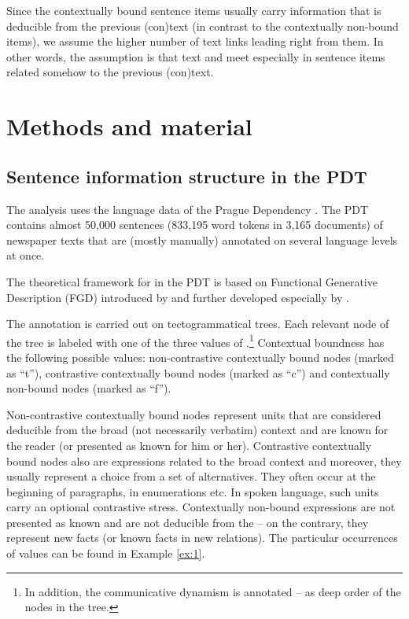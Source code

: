 \documentclass[output=paper]{langsci/langscibook.cls}
\begin{document}
Since the contextually bound sentence items usually carry information that is deducible from the previous (con)text (in contrast to the contextually non-bound items), we assume the higher number of text  links leading right from them. In other words, the assumption is that text  and  meet especially in sentence items related somehow to the previous (con)text.

\section{Methods and material\label{rysova_k:sec:MethodsAndMaterial}}

\subsection{Sentence information structure in the PDT\label{rysova_k:sec:SentenceInformation}}

The analysis uses the language data of the Prague Dependency . The PDT contains almost 50,000 sentences (833,195 word tokens in 3,165 documents) of  newspaper texts that are (mostly manually) annotated on several language levels at once. 

The theoretical framework for  in the PDT is based on Functional Generative Description (FGD) introduced by \citet{Sgall1967} and further developed especially by \citet{hajicova1998topic}. 

The annotation is carried out on tectogrammatical trees. Each relevant node of the tree is labeled with one of the three values of .\footnote{In addition, the communicative dynamism is annotated -- as deep order of the nodes in the tree.} Contextual boundness has the following possible values: non-contrastive contextually bound nodes (marked as ``t''), contrastive contextually bound nodes (marked as ``c'') and contextually non-bound nodes (marked as ``f''). 

Non-contrastive contextually bound nodes represent units that are considered deducible from the broad (not necessarily verbatim) context and are known for the reader (or presented as known for him or her). Contrastive contextually bound nodes also are expressions related to the broad context and moreover, they usually represent a choice from a set of alternatives. They often occur at the beginning of paragraphs, in enumerations etc. In spoken language, such units carry an optional contrastive stress. Contextually non-bound expressions are not presented as known and are not deducible from the  -- on the contrary, they represent new facts (or known facts in new relations). The particular occurrences of  values can be found in Example \ref{ex:1}. \ 
\end{document}
